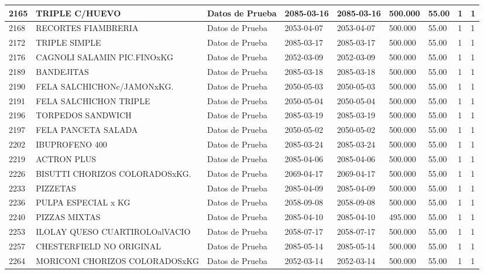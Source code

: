 \documentclass[a4paper,12pt]{article}
\begin{document}
\begin{landscape}
\begin{longtable}{|p{4cm}|p{2.5cm}|p{2.5cm}|p{1.8cm}|p{1.8cm}|p{1cm}|p{1cm}|p{3cm}|p{3cm}||}
2165 & TRIPLE C/HUEVO & Datos de Prueba & 2085-03-16 & 2085-03-16 & 500.000 & 55.00 & 1 & 1 \\ \hline 
2168 & RECORTES FIAMBRERIA & Datos de Prueba & 2053-04-07 & 2053-04-07 & 500.000 & 55.00 & 1 & 1 \\ \hline 
2172 & TRIPLE SIMPLE & Datos de Prueba & 2085-03-17 & 2085-03-17 & 500.000 & 55.00 & 1 & 1 \\ \hline 
2176 & CAGNOLI SALAMIN PIC.FINOxKG & Datos de Prueba & 2052-03-09 & 2052-03-09 & 500.000 & 55.00 & 1 & 1 \\ \hline 
2189 & BANDEJITAS & Datos de Prueba & 2085-03-18 & 2085-03-18 & 500.000 & 55.00 & 1 & 1 \\ \hline 
2190 & FELA SALCHICHONc/JAMONxKG. & Datos de Prueba & 2050-05-03 & 2050-05-03 & 500.000 & 55.00 & 1 & 1 \\ \hline 
2191 & FELA SALCHICHON TRIPLE & Datos de Prueba & 2050-05-04 & 2050-05-04 & 500.000 & 55.00 & 1 & 1 \\ \hline 
2196 & TORPEDOS SANDWICH & Datos de Prueba & 2085-03-19 & 2085-03-19 & 500.000 & 55.00 & 1 & 1 \\ \hline 
2197 & FELA PANCETA SALADA & Datos de Prueba & 2050-05-02 & 2050-05-02 & 500.000 & 55.00 & 1 & 1 \\ \hline 
2202 & IBUPROFENO  400 & Datos de Prueba & 2085-03-24 & 2085-03-24 & 500.000 & 55.00 & 1 & 1 \\ \hline 
2219 & ACTRON  PLUS & Datos de Prueba & 2085-04-06 & 2085-04-06 & 500.000 & 55.00 & 1 & 1 \\ \hline 
2226 & BISUTTI CHORIZOS COLORADOSxKG. & Datos de Prueba & 2069-04-17 & 2069-04-17 & 500.000 & 55.00 & 1 & 1 \\ \hline 
2233 & PIZZETAS & Datos de Prueba & 2085-04-09 & 2085-04-09 & 500.000 & 55.00 & 1 & 1 \\ \hline 
2236 & PULPA ESPECIAL x KG & Datos de Prueba & 2058-09-08 & 2058-09-08 & 500.000 & 55.00 & 1 & 1 \\ \hline 
2240 & PIZZAS   MIXTAS & Datos de Prueba & 2085-04-10 & 2085-04-10 & 495.000 & 55.00 & 1 & 1 \\ \hline 
2253 & ILOLAY QUESO CUARTIROLOalVACIO & Datos de Prueba & 2058-07-17 & 2058-07-17 & 500.000 & 55.00 & 1 & 1 \\ \hline 
2257 & CHESTERFIELD  NO  ORIGINAL & Datos de Prueba & 2085-05-14 & 2085-05-14 & 500.000 & 55.00 & 1 & 1 \\ \hline 
2264 & MORICONI CHORIZOS COLORADOSxKG & Datos de Prueba & 2052-03-14 & 2052-03-14 & 500.000 & 55.00 & 1 & 1 \\ \hline 

\end{longtable}
\end{landscape}
\end{document}
